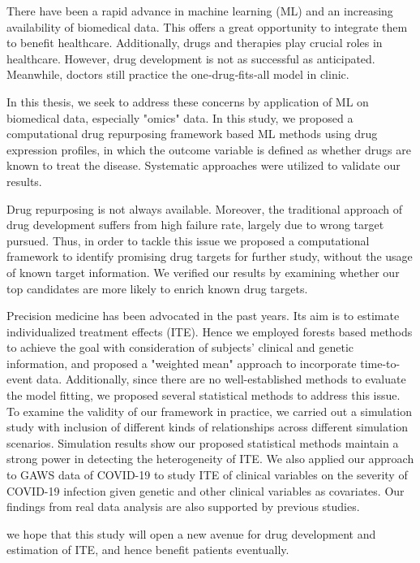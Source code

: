 There have been a rapid advance in machine learning (ML) and an increasing availability of biomedical data. This offers a great opportunity to integrate them to benefit healthcare. Additionally, drugs and therapies play crucial roles in healthcare. However, drug development is not as successful as anticipated. Meanwhile, doctors still practice the one‐drug‐fits‐all model in clinic. 

In this thesis, we seek to address these concerns by application of ML on biomedical data, especially "omics" data. In this study, we proposed a computational drug repurposing framework based ML methods using drug expression profiles, in which the outcome variable is defined as whether drugs are known to treat the disease. Systematic approaches were utilized to validate our results. 

Drug repurposing is not always available. Moreover, the traditional approach of drug development suffers from high failure rate, largely due to wrong target pursued. Thus, in order to tackle this issue we proposed a computational framework to identify promising drug targets for further study, without the usage of known target information. We verified our results by examining whether our top candidates are more likely to enrich known drug targets.

Precision medicine has been advocated in the past years. Its aim is to estimate individualized treatment effects (ITE). Hence we employed forests based methods to achieve the goal with consideration of subjects' clinical and genetic information, and proposed a "weighted mean" approach to incorporate time-to-event data. Additionally, since there are no well-established methods to evaluate the model fitting, we proposed several statistical methods to address this issue. To examine the validity of our framework in practice, we carried out a simulation study with inclusion of different kinds of relationships across different simulation scenarios. Simulation results show our proposed statistical methods maintain a strong power in detecting the heterogeneity of ITE. We also applied our approach to GAWS data of COVID-19 to study ITE of clinical variables on the severity of COVID-19 infection given genetic and other clinical variables as covariates. Our findings from real data analysis are also supported by previous studies.

we hope that this study will open a new avenue for drug development and estimation of ITE, and hence benefit patients eventually.
